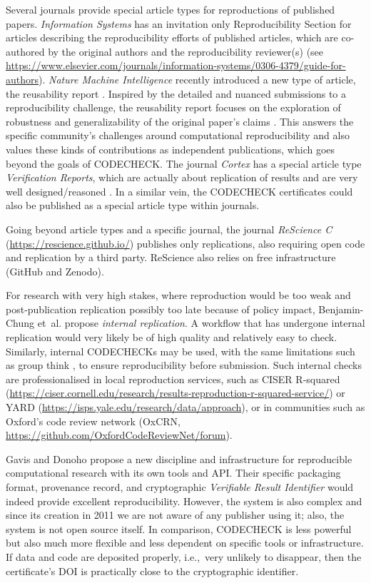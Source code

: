 \documentclass[12pt]{article}
\begin{document}
Several journals provide special article types for reproductions of
published papers.  \emph{Information Systems} has an invitation only
Reproducibility Section for articles describing the reproducibility 
efforts of published articles, which are co-authored by the original
authors and the reproducibility reviewer(s) (see
\url{https://www.elsevier.com/journals/information-systems/0306-4379/guide-for-authors}).
\emph{Nature Machine Intelligence} recently introduced a new type of
article, the reusability report \cite{noauthor_research_2020}.
Inspired by the detailed and nuanced submissions to a reproducibility
challenge, the reusability report focuses on the exploration of
robustness and generalizability of the original paper's claims
\cite{noauthor_research_2020}. This answers the specific community's
challenges around computational reproducibility and also values these
kinds of contributions as independent publications, which goes beyond
the goals of CODECHECK.  The journal \emph{Cortex} has a special
article type \emph{Verification Reports}, which are actually about
replication of results and are very well designed/reasoned
\cite{chambers_verification_2020}.  In a similar vein, the CODECHECK
certificates could also be published as a special article type within
journals.

Going beyond article types and a specific journal, the journal
\emph{ReScience C} (\url{https://rescience.github.io/}) publishes only
replications, also
requiring open code and replication by a third party. ReScience also
relies on free infrastructure (GitHub and Zenodo).

For research with very high stakes, where reproduction would be too weak and
post-publication replication possibly too late because of policy impact,
Benjamin-Chung et~al. \cite{benjamin-chung_internal_2020} propose
\emph{internal replication}.
A workflow that has undergone internal
replication would very likely be of high quality and relatively easy to check.
Similarly, internal CODECHECKs may be used, with the same limitations such
as group think \cite{benjamin-chung_internal_2020},
to ensure reproducibility before submission.
Such internal checks are professionalised in local reproduction services,
such as CISER R-squared
(\url{https://ciser.cornell.edu/research/results-reproduction-r-squared-service/})
or YARD (\url{https://isps.yale.edu/research/data/approach}),
or in communities such as Oxford's code review network (OxCRN,
\url{https://github.com/OxfordCodeReviewNet/forum}).

Gavis and Donoho \cite{gavish_universal_2011} propose a new discipline
and infrastructure for reproducible computational research with its
own tools and API. Their specific packaging format, provenance record,
and cryptographic \emph{Verifiable Result Identifier} would indeed
provide excellent reproducibility. However, the system is also complex
and since its creation in 2011 we are not aware of any publisher using
it; also, the system is not open source itself.  In comparison,
CODECHECK is less powerful but also much more flexible and less
dependent on specific tools or infrastructure. If data and code are
deposited properly, i.e.,~very unlikely to disappear, then the
certificate's DOI is practically close to the cryptographic
identifier.
\end{document}
